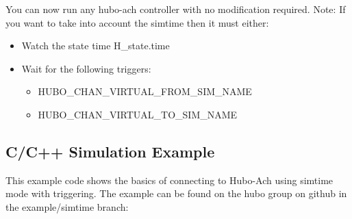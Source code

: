 You can now run any hubo-ach controller with no modification required. Note: If you want to take into account the simtime then it must either:
\begin{itemize}
	\item Watch the state time H\_state.time
	\item Wait for the following triggers:
	\begin{itemize}
		\item HUBO\_CHAN\_VIRTUAL\_FROM\_SIM\_NAME
		\item HUBO\_CHAN\_VIRTUAL\_TO\_SIM\_NAME
	\end{itemize}
\end{itemize}



\subsection{C/C++ Simulation Example}

This example code shows the basics of connecting to Hubo-Ach using simtime mode with triggering. The example can be found on the hubo group on github in the example/simtime branch:






